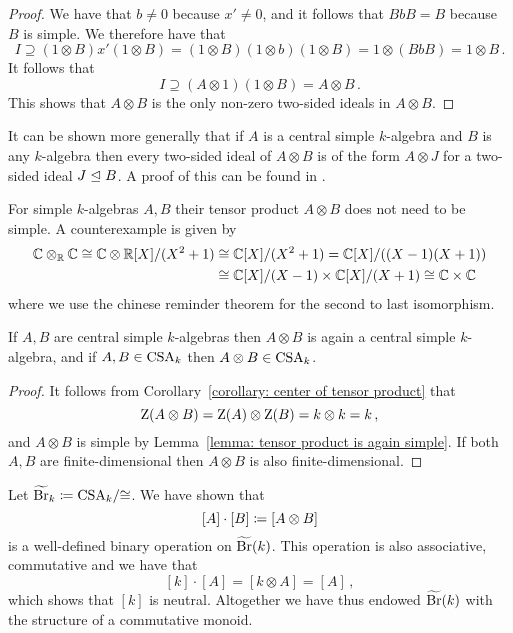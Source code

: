 \begin{proof}
  We have that $b \neq 0$ because $x' \neq 0$, and it follows that $BbB = B$ because $B$ is simple.
  We therefore have that
  \[
              I
    \supseteq (1 \otimes B) x' (1 \otimes B)
    =         (1 \otimes B) (1 \otimes b) (1 \otimes B)
    =         1 \otimes (BbB)
    =         1 \otimes B \,.
  \]
  It follows that
  \[
              I
    \supseteq (A \otimes 1) (1 \otimes B)
    =         A \otimes B \,.
  \]
  This shows that $A \otimes B$ is the only non-zero two-sided ideals in $A \otimes B$.
\end{proof}


\begin{remark}
  It can be shown more generally that if $A$ is a central simple $k$-algebra and $B$ is any $k$-algebra then every two-sided ideal of $A \otimes B$ is of the form $A \otimes J$ for a two-sided ideal $J \trianglelefteq B$.
  A proof of this can be found in \cite[Lemma~4.1]{Clark2012NonCA}.
\end{remark}


\begin{warning}
  For simple $k$-algebras $A, B$ their tensor product $A \otimes B$ does not need to be simple.
  A counterexample is given by
  \begin{align*}
            \mathbb{C} \otimes_{\mathbb{R}} \mathbb{C}
     \cong  \mathbb{C} \otimes \mathbb{R}[X]/(X^2 + 1)
    &\cong  \mathbb{C}[X]/(X^2 + 1)
     =      \mathbb{C}[X]/((X-1)(X+1))
    \\
    &\cong  \mathbb{C}[X]/(X-1) \times \mathbb{C}[X]/(X+1)
     \cong  \mathbb{C} \times \mathbb{C}
  \end{align*}
  where we use the chinese reminder theorem for the second to last isomorphism.
\end{warning}


\begin{proposition}
  If $A, B$ are central simple $k$-algebras then $A \otimes B$ is again a central simple $k$-algebra, and if $A, B \in \operatorname{CSA}_k$ then $A \otimes B \in \operatorname{CSA}_k$.
\end{proposition}


\begin{proof}
  It follows from Corollary~\ref{corollary: center of tensor product} that
  \[
      \operatorname{Z}(A \otimes B)
    = \operatorname{Z}(A) \otimes \operatorname{Z}(B)
    = k \otimes k
    = k \,,
  \]
  and $A \otimes B$ is simple by Lemma~\ref{lemma: tensor product is again simple}.
  If both $A, B$ are finite-dimensional then $A \otimes B$ is also finite-dimensional.
\end{proof}


\begin{fluff}
  Let $\widetilde{\operatorname{Br}}_k \coloneqq \operatorname{CSA}_k\!/{\cong}$.
  We have shown that
  \[
              [A] \cdot [B]
    \coloneqq  [A \otimes B]
  \]
  is a well-defined binary operation on $\widetilde{\operatorname{Br}}(k)$.
  This operation is also associative, commutative and we have that
  \[
      [k] \cdot [A]
    = [k \otimes A]
    = [A] \,,
  \]
  which shows that $[k]$ is neutral.
  Altogether we have thus endowed $\widetilde{\operatorname{Br}}(k)$ with the structure of a commutative monoid.
\end{fluff}





